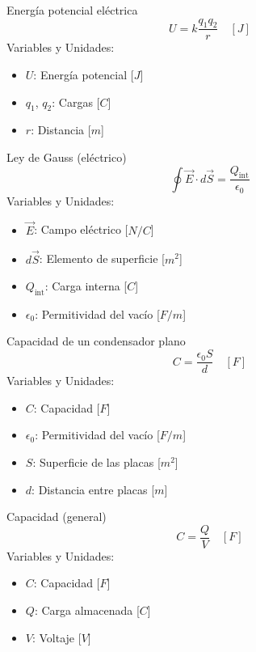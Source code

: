 \documentclass{article}
\begin{document}
\begin{multicols}{3}
\begin{teorema}{Energía potencial eléctrica}
    $$U = k\frac{q_1 q_2}{r} \quad [J]$$
    Variables y Unidades:
    \begin{itemize}
        \item $U$: Energía potencial [$J$]
        \item $q_1$, $q_2$: Cargas [$C$]
        \item $r$: Distancia [$m$]
    \end{itemize}
\end{teorema}

\columnbreak

\begin{teorema}{Ley de Gauss (eléctrico)}
    $$\oint \vec{E} \cdot d\vec{S} = \frac{Q_{\text{int}}}{\epsilon_0}$$
    Variables y Unidades:
    \begin{itemize}
        \item $\vec{E}$: Campo eléctrico [$N/C$]
        \item $d\vec{S}$: Elemento de superficie [$m^2$]
        \item $Q_{\text{int}}$: Carga interna [$C$]
        \item $\epsilon_0$: Permitividad del vacío [$F/m$]
    \end{itemize}
\end{teorema}

\begin{teorema}{Capacidad de un condensador plano}
    $$C = \frac{\epsilon_0 S}{d} \quad [F]$$
    Variables y Unidades:
    \begin{itemize}
        \item $C$: Capacidad [$F$]
        \item $\epsilon_0$: Permitividad del vacío [$F/m$]
        \item $S$: Superficie de las placas [$m^2$]
        \item $d$: Distancia entre placas [$m$]
    \end{itemize}
\end{teorema}

\begin{teorema}{Capacidad (general)}
    $$C = \frac{Q}{V} \quad [F]$$
    Variables y Unidades:
    \begin{itemize}
        \item $C$: Capacidad [$F$]
        \item $Q$: Carga almacenada [$C$]
        \item $V$: Voltaje [$V$]
    \end{itemize}
\end{teorema}


\end{multicols}
\end{document}
